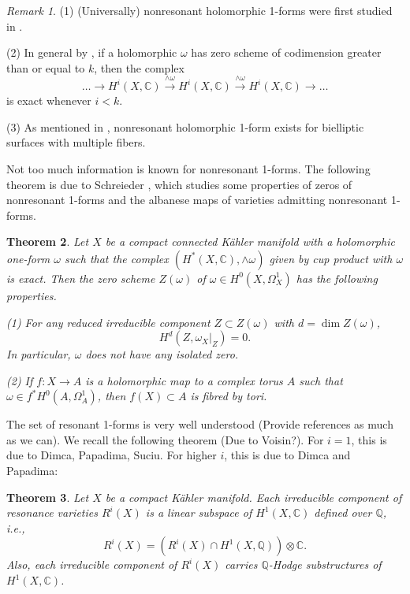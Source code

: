 \documentclass[a4paper,12pt,reqno]{amsart}
\newtheorem{theorem}{Theorem}[section]
\theoremstyle{plain}
\theoremstyle{remark}
\newtheorem{remark}[theorem]{Remark}
\newcommand{\Q}{\mathbb Q}
\newcommand{\C}{\mathbb C}
\begin{document}
\begin{remark}

(1) (Universally) nonresonant  holomorphic 1-forms were first studied in \cite{SS19}.

(2) In general by \cite[Proposition 3.4]{GL87}, if a holomorphic $\omega$ has zero scheme of codimension greater than or equal to $k$, then the complex $$\ldots\to H^{i}(X,\C)\overset{\wedge\omega}{\rightarrow}H^{i}(X,\C)\overset{\wedge\omega}{\rightarrow}H^{i}(X,\C)\to\ldots$$ is exact whenever $i<k.$ 

 
(3) As mentioned in \cite[1.6]{SS19}, nonresonant holomorphic 1-form exists for bielliptic surfaces with multiple fibers. 
\end{remark}

Not too much information is known for nonresonant 1-forms. The following theorem is due to Schreieder \cite{SS19}, which studies some properties of zeros of nonresonant 1-forms and the albanese maps of varieties admitting nonresonant 1-forms.

\begin{theorem} \label{thm:stefan}
Let $X$ be a compact connected K\"ahler manifold with a holomorphic one-form $\omega$ such that the complex $(H^*(X, \C), \wedge\omega)$ given by cup product with $\omega$ is exact. Then
the zero scheme $Z(\omega)$ of $\omega\in H^0(X,\Omega_X^1)$ has the following properties.

(1) For any reduced irreducible component $Z \subset Z(\omega)$ with $d=\dim Z(\omega)$, $$H^d(Z, \omega_X|_Z)=0.$$
In particular, $\omega$ does not have any isolated zero.

(2) If $f : X \to A$ is a holomorphic map to a complex torus $A$ such that $\omega \in f^*H^0(A, \Omega^1_A)$,
then $f(X)\subset A$ is fibred by tori.
\end{theorem}

The set of resonant 1-forms is very well understood {\color{red} (Provide references as much as we can)}. We recall the following theorem {\color{red} (Due to Voisin?)}. For $i=1$, this is due to Dimca, Papadima, Suciu. For higher $i$, this is due to Dimca and Papadima:

\begin{theorem}{\cite[Theorem C, Corollary 1.7]{DiPa13}}\label{thm: resonant}
Let $X$ be a compact K\"ahler manifold. Each irreducible component of resonance varieties $R^i(X)$ is a linear subspace of $H^1(X, \C)$ defined over $\Q$, i.e., $$R^i(X)=(R^i(X)\cap H^1(X, \Q))\otimes\C.$$ Also,  each irreducible component of $R^i(X)$ carries $\Q$-Hodge substructures of $H^1(X, \C)$.
\end{theorem} 
\end{document}
